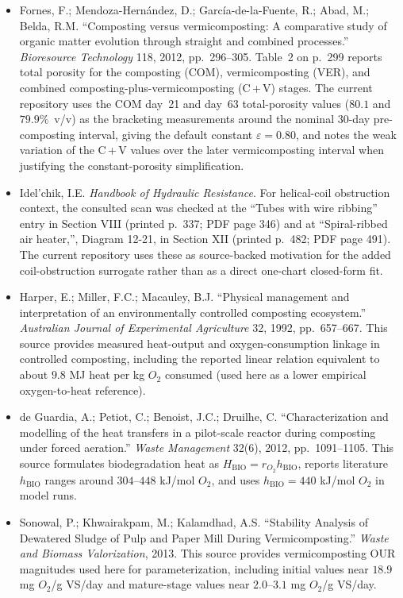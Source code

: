 \documentclass[11pt]{article}
\begin{document}
\begin{itemize}[leftmargin=*]
\item [R16] Fornes, F.; Mendoza-Hern\'andez, D.; Garc\'ia-de-la-Fuente, R.; Abad, M.; Belda, R.M. ``Composting versus vermicomposting: A comparative study of organic matter evolution through straight and combined processes.'' \emph{Bioresource Technology} 118, 2012, pp.~296--305. Table~2 on p.~299 reports total porosity for the composting (COM), vermicomposting (VER), and combined composting-plus-vermicomposting (C\,+\,V) stages. The current repository uses the COM day~21 and day~63 total-porosity values (\(80.1\) and \(79.9\%\)~v/v) as the bracketing measurements around the nominal 30-day pre-composting interval, giving the default constant \(\varepsilon=0.80\), and notes the weak variation of the C\,+\,V values over the later vermicomposting interval when justifying the constant-porosity simplification.
\item [R17] Idel'chik, I.E. \emph{Handbook of Hydraulic Resistance}. For helical-coil obstruction context, the consulted scan was checked at the ``Tubes with wire ribbing'' entry in Section VIII (printed p.~337; PDF page 346) and at ``Spiral-ribbed air heater,'', Diagram 12-21, in Section XII (printed p.~482; PDF page 491). The current repository uses these as source-backed motivation for the added coil-obstruction surrogate rather than as a direct one-chart closed-form fit.
\item [R18] Harper, E.; Miller, F.C.; Macauley, B.J. ``Physical management and interpretation of an environmentally controlled composting ecosystem.'' \emph{Australian Journal of Experimental Agriculture} 32, 1992, pp.~657--667. This source provides measured heat-output and oxygen-consumption linkage in controlled composting, including the reported linear relation equivalent to about \(9.8\) MJ heat per kg \(O_2\) consumed (used here as a lower empirical oxygen-to-heat reference).
\item [R19] de Guardia, A.; Petiot, C.; Benoist, J.C.; Druilhe, C. ``Characterization and modelling of the heat transfers in a pilot-scale reactor during composting under forced aeration.'' \emph{Waste Management} 32(6), 2012, pp.~1091--1105. This source formulates biodegradation heat as \(H_{\mathrm{BIO}}=r_{O_2}h_{\mathrm{BIO}}\), reports literature \(h_{\mathrm{BIO}}\) ranges around \(304\)--\(448\) kJ/mol \(O_2\), and uses \(h_{\mathrm{BIO}}=440\) kJ/mol \(O_2\) in model runs.
\item [R20] Sonowal, P.; Khwairakpam, M.; Kalamdhad, A.S. ``Stability Analysis of Dewatered Sludge of Pulp and Paper Mill During Vermicomposting.'' \emph{Waste and Biomass Valorization}, 2013. This source provides vermicomposting OUR magnitudes used here for parameterization, including initial values near \(18.9\) mg \(O_2\)/g VS/day and mature-stage values near \(2.0\)--\(3.1\) mg \(O_2\)/g VS/day.

\end{itemize}
\end{document}
